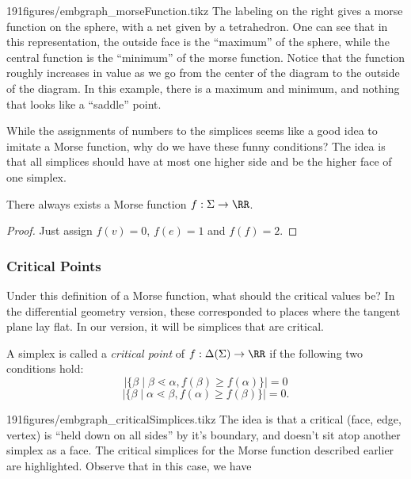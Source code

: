\begin{examplefigureenv}{191figures/embgraph_morseFunction.tikz}
	The labeling on the right gives a morse function on the sphere, with a net given by a tetrahedron. One can see that in this representation, the outside face is the ``maximum'' of the sphere, while the central function is the ``minimum'' of the morse function. Notice that the function roughly increases in value as we go from the center of the diagram to the outside of the diagram. In this example, there is a maximum and minimum, and nothing that looks like a ``saddle'' point. 
\end{examplefigureenv}
While the assignments of numbers to the simplices seems like a good idea to imitate a Morse function,  why do we have these funny conditions?  The idea is that all simplices should have at most one higher side and be the higher face of one simplex. \\
\begin{claim}
	There always exists a Morse function $f: \Sigma\to \RR$.
\end{claim}
\begin{proof}
	Just assign $f(v)=0$, $f(e)=1$ and $f(f)=2$. 
\end{proof}
\subsubsection{Critical Points}
Under this definition of a Morse function,  what should the critical values be? In the differential geometry version,  these corresponded to places where the tangent plane lay flat. In our version,  it will be simplices that are critical. 

\begin{definition}
	A simplex is called a \emph{critical point} of $f: \Delta(\Sigma)\to \RR$ if the following two conditions hold:
	\[|\{\beta \;|\; \beta\lessdot \alpha ,  f(\beta)\geq f(\alpha)\}|=0\]
\[|\{\beta \;|\; \alpha\lessdot \beta ,  f(\alpha)\geq f(\beta)\}|=0.\]
\end{definition}

\begin{paragraphfigureenv}{191figures/embgraph_criticalSimplices.tikz}
The idea is that a critical (face, edge, vertex) is ``held down on all sides'' by it's boundary,  and doesn't sit atop another simplex as a face. The critical simplices for the Morse function described earlier are highlighted. Observe that in this case, we have  
\end{paragraphfigureenv}


